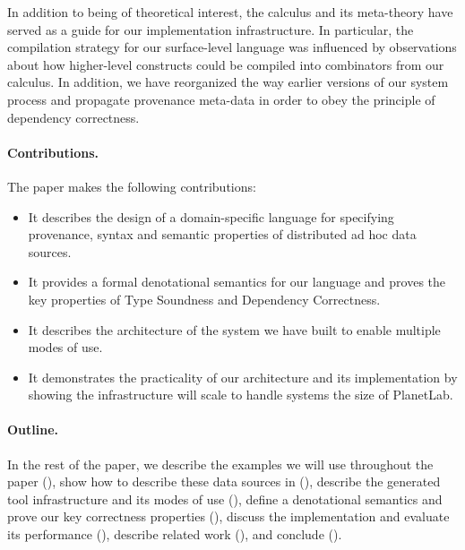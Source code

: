 In addition to being of theoretical interest, the calculus and its meta-theory
have served as a guide for our implementation infrastructure.  In particular,
the compilation strategy for our surface-level language was influenced by
observations about how higher-level constructs could be compiled into
combinators from our calculus.   In addition, we have reorganized the way 
earlier versions of our system process and propagate provenance meta-data
in order to obey the principle of dependency correctness. 

\paragraph*{Contributions.} The paper makes the following
contributions:

\begin{itemize}
\item It describes the design of a
domain-specific language for specifying provenance, syntax and
semantic properties of distributed ad hoc data
sources.  

\item It provides a formal denotational semantics for our language
and proves the key properties of Type Soundness
and Dependency Correctness.

\item It describes the architecture of the system we have built to 
enable multiple modes of use.

\item It demonstrates the practicality of our architecture and its
  implementation by showing the infrastructure will scale to handle
  systems the size of PlanetLab.
\end{itemize}

\paragraph{Outline.}
In the rest of the paper, we describe the examples we will
use throughout the paper (), show how to describe
these data sources in \padsd{} (), describe
the generated tool infrastructure and its modes of use
(), define a denotational semantics and prove
our key correctness properties (),  
discuss the implementation and
evaluate its performance (), describe
related work (), and conclude
(). 

